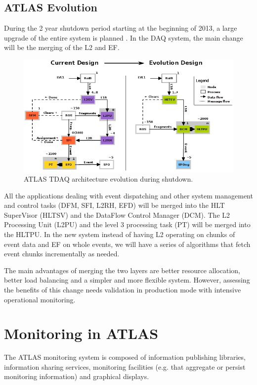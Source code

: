 \subsection*{ATLAS Evolution}

During the 2 year shutdown period starting at the beginning of 2013, a large upgrade of the entire system is planned \citep{hauser2012atlas}. In the DAQ system, the main change will be the merging of the L2 and EF.  

\begin{figure}[ht!]
\centering
\includegraphics[scale=0.55]{Images/Evolution.png}
\caption{ATLAS TDAQ architecture evolution during shutdown.}
\end{figure}

All the applications dealing with event dispatching and other system management and control tasks (DFM, SFI, L2RH, EFD) will be merged into the HLT SuperVisor (HLTSV) and the DataFlow Control Manager (DCM). 
The L2 Processing Unit (L2PU) and the level 3 processing task (PT) will be merged into the HLTPU. In the new system instead of having L2 operating on chunks of event data and EF on whole events, we will have a series of algorithms that fetch event chunks incrementally as needed.

The main advantages of merging the two layers are better resource allocation, better load balancing and a simpler and more flexible system. However, assessing the benefits of this change needs validation in production mode with intensive operational monitoring.

\section{Monitoring in ATLAS}

The ATLAS monitoring system \citep{collaboration2003atlas} is composed of information publishing libraries, information sharing services, monitoring facilities (e.g. that aggregate or persist monitoring information) and graphical displays.

